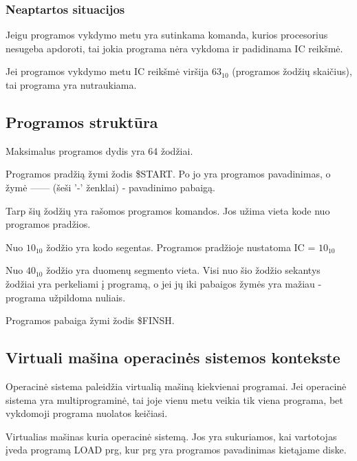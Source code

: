 \documentclass{VUMIFInfKursinis}
\begin{document}
\subsubsection{Neaptartos situacijos}

Jeigu programos vykdymo metu yra sutinkama komanda, kurios procesorius nesugeba apdoroti, tai jokia programa nėra vykdoma ir padidinama IC reikšmė.

Jei programos vykdymo metu IC reikšmė viršija $63_{10}$ (programos žodžių skaičius), tai programa yra nutraukiama.

\subsection{Programos struktūra}

Maksimalus programos dydis yra 64 žodžiai.

Programos pradžią žymi žodis \$START. Po jo yra programos pavadinimas, o žymė ------ (šeši '-' ženklai) - pavadinimo pabaigą. 

Tarp šių žodžių yra rašomos programos komandos. Jos užima vieta kode nuo programos pradžios. 

Nuo $10_{10}$ žodžio yra kodo segentas. Programos pradžioje nustatoma IC = $10_{10}$

Nuo $40_{10}$ žodžio yra duomenų segmento vieta. Visi nuo šio žodžio sekantys žodžiai yra perkeliami į programą, o jei jų iki pabaigos žymės yra mažiau - programa užpildoma nuliais.

Programos pabaiga žymi žodis \$FINSH. 

\subsection{Virtuali mašina operacinės sistemos kontekste}

Operacinė sistema paleidžia virtualią mašiną kiekvienai programai. Jei operacinė sistema yra multiprograminė, tai joje vienu metu veikia tik viena programa, bet vykdomoji programa nuolatos keičiasi.

Virtualias mašinas kuria operacinė sistemą. Jos yra sukuriamos, kai vartotojas įveda programą LOAD prg, kur prg yra programos pavadinimas kietąjame diske.

\printbibliography[heading=bibintoc] %
\appendix  %
\end{document}
